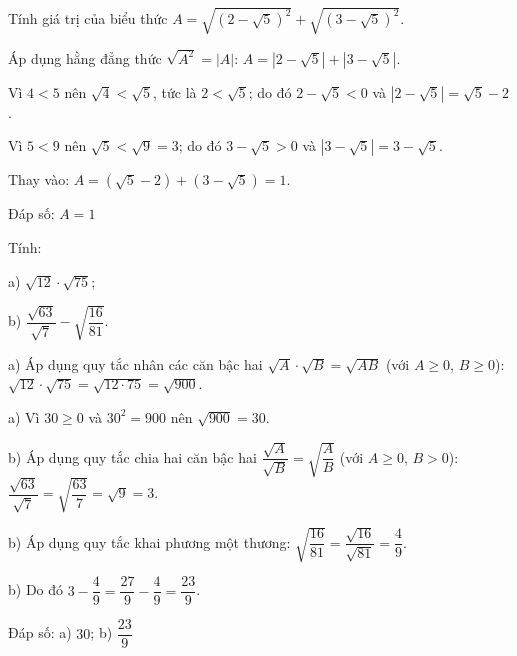 \begin{problem}[9DS-CAN-002]
Tính giá trị của biểu thức $A = \sqrt{(2 - \sqrt{5})^2} + \sqrt{(3 - \sqrt{5})^2}$.

\begin{solution}
Áp dụng hằng đẳng thức $\sqrt{A^2} = |A|$: $A = |2 - \sqrt{5}| + |3 - \sqrt{5}|$.

Vì $4 < 5$ nên $\sqrt{4} < \sqrt{5}$, tức là $2 < \sqrt{5}$; do đó $2 - \sqrt{5} < 0$ và $|2 - \sqrt{5}| = \sqrt{5} - 2$.

Vì $5 < 9$ nên $\sqrt{5} < \sqrt{9} = 3$; do đó $3 - \sqrt{5} > 0$ và $|3 - \sqrt{5}| = 3 - \sqrt{5}$.

Thay vào: $A = (\sqrt{5} - 2) + (3 - \sqrt{5}) = 1$.

Đáp số: $\boxed{A = 1}$
\end{solution}
\end{problem}

\begin{problem}[9DS-CAN-003]
Tính:

a) $\sqrt{12} \cdot \sqrt{75}$;

b) $\dfrac{\sqrt{63}}{\sqrt{7}} - \sqrt{\dfrac{16}{81}}$.

\begin{solution}
a) Áp dụng quy tắc nhân các căn bậc hai $\sqrt{A} \cdot \sqrt{B} = \sqrt{AB}$ (với $A \geq 0$, $B \geq 0$): $\sqrt{12} \cdot \sqrt{75} = \sqrt{12 \cdot 75} = \sqrt{900}$.

a) Vì $30 \geq 0$ và $30^2 = 900$ nên $\sqrt{900} = 30$.

b) Áp dụng quy tắc chia hai căn bậc hai $\dfrac{\sqrt{A}}{\sqrt{B}} = \sqrt{\dfrac{A}{B}}$ (với $A \geq 0$, $B > 0$): $\dfrac{\sqrt{63}}{\sqrt{7}} = \sqrt{\dfrac{63}{7}} = \sqrt{9} = 3$.

b) Áp dụng quy tắc khai phương một thương: $\sqrt{\dfrac{16}{81}} = \dfrac{\sqrt{16}}{\sqrt{81}} = \dfrac{4}{9}$.

b) Do đó $3 - \dfrac{4}{9} = \dfrac{27}{9} - \dfrac{4}{9} = \dfrac{23}{9}$.

Đáp số: a) $\boxed{30}$; b) $\boxed{\dfrac{23}{9}}$
\end{solution}
\end{problem}

